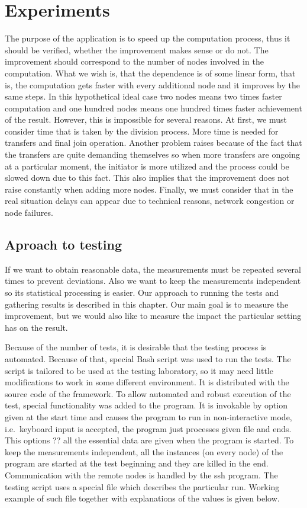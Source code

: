 \chapter{Experiments}\label{experiments}

The purpose of the application is to speed up the computation process,
thus it should be verified, whether the improvement makes sense or do
not. The improvement should correspond to the number of nodes involved
in the computation. What we wish is, that the dependence is of some
linear form, that is, the computation gets faster with every additional
node and it improves by the same steps. In this hypothetical ideal case
two nodes means two times faster computation and one hundred nodes means
one hundred times faster achievement of the result. However, this is
impossible for several reasons. At first, we must consider time that is
taken by the division process. More time is needed for transfers and
final join operation. Another problem raises because of the fact that
the transfers are quite demanding themselves so when more transfers are
ongoing at a particular moment, the initiator is more utilized and the
process could be slowed down due to this fact. This also implies that
the improvement does not raise constantly when adding more nodes.
Finally, we must consider that in the real situation delays can appear
due to technical reasons, network congestion or node failures.

\section{Aproach to testing}\label{aproach-to-testing}

If we want to obtain reasonable data, the measurements must be repeated
several times to prevent deviations. Also we want to keep the
measurements independent so its statistical processing is easier. Our
approach to running the tests and gathering results is described in this
chapter. Our main goal is to measure the improvement, but we would also
like to measure the impact the particular setting has on the result.

Because of the number of tests, it is desirable that the testing process
is automated. Because of that, special Bash script was used to run the
tests. The script is tailored to be used at the testing laboratory, so
it may need little modifications to work in some different environment.
It is distributed with the source code of the framework. To allow
automated and robust execution of the test, special functionality was
added to the program. It is invokable by option given at the start time
and causes the program to run in non-interactive mode, i.e.~keyboard
input is accepted, the program just processes given file and ends. This
options ?? all the essential data are given when the program is started.
To keep the measurements independent, all the instances (on every node)
of the program are started at the test beginning and they are killed in
the end. Communication with the remote nodes is handled by the ssh
program. The testing script uses a special file which describes the
particular run. Working example of such file together with explanations
of the values is given below.

